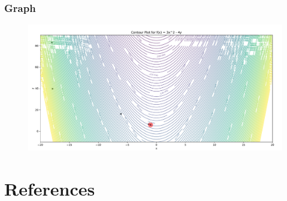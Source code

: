 \documentclass{article}
\begin{document}
\subsubsection*{Graph}

\begin{figure}[H]
\centering
    \includegraphics[width=450px]{graph2.pdf}
\label{fig:acc2}
\end{figure}


%

\section{References}
\end{document}
